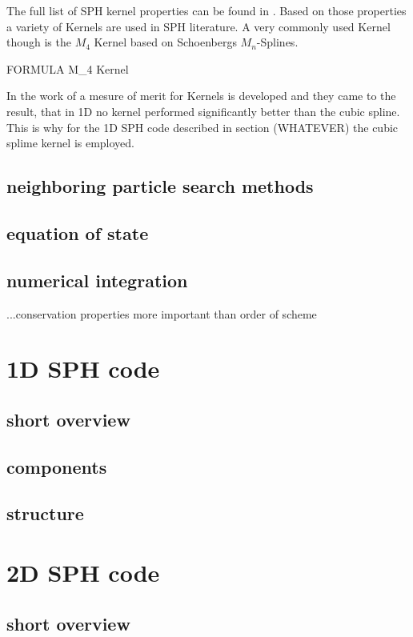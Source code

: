 \documentclass{report}
\begin{document}
The full list of SPH kernel properties can be found in  \cite{Liu2003}.
Based on those properties a variety of Kernels are used in SPH literature. A
very commonly used Kernel though is the $M_4$ Kernel based on Schoenbergs
$M_n$-Splines\cite{Schoenberg1946}.

FORMULA M_4 Kernel

In the work of \cite{Fulk1996} a mesure of merit for Kernels is developed and
they came to the result, that in 1D no kernel performed significantly better
than the cubic spline.
This is why for the 1D SPH code described in section (WHATEVER) the cubic
splime kernel is employed.

\subsection{neighboring particle search methods}

\subsection{equation of state}

\subsection{numerical integration}
...conservation properties more important than order of scheme\cite{Monaghan2005}



\section{1D SPH code}
\subsection{short overview}
\subsection{components}
\subsection {structure}
\section{2D SPH code}
\subsection{short overview}
\end{document}
